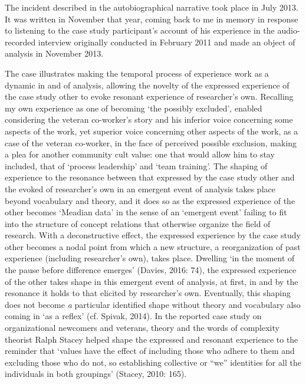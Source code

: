The incident described in the autobiographical narrative took place in July 2013. It was written in November that year, coming back to me in memory in response to listening to the case study participant’s account of his experience in the audio-recorded interview originally conducted in February 2011 and made an object of analysis in November 2013. 

The case illustrates making the temporal process of experience work as a dynamic in and of analysis, allowing the novelty of the expressed experience of the case study other to evoke resonant experience of researcher’s own. Recalling my own experience as one of becoming ‘the possibly excluded’, enabled considering the veteran co-worker’s story and his inferior voice concerning some aspects of the work, yet superior voice concerning other aspects of the work, as a case of the veteran co-worker, in the face of perceived possible exclusion, making a plea for another community cult value: one that would allow him to stay included, that of ‘process leadership’ and ‘team training’. The shaping of experience to the resonance between that expressed by the case study other and the evoked of researcher’s own in an emergent event of analysis takes place beyond vocabulary and theory, and it does so as the expressed experience of the other becomes ‘Meadian data’ in the sense of an ‘emergent event’ failing to fit into the structure of concept relations that otherwise organize the field of research. With a deconstructive effect, the expressed experience by the case study other becomes a nodal point from which a new structure, a reorganization of past experience (including researcher’s own), takes place. Dwelling ‘in the moment of the pause before difference emerges’ (Davies, 2016: 74), the expressed experience of the other takes shape in this emergent event of analysis, at first, in and by the resonance it holds to that elicited by researcher’s own. Eventually, this shaping does not become \textit{a} particular identified shape without theory and vocabulary also coming in ‘as a reflex’ (cf. Spivak, 2014). In the reported case study on organizational newcomers and veterans, theory and the words of complexity theorist Ralph Stacey helped shape the expressed and resonant experience to the reminder that ‘values have the effect of including those who adhere to them and excluding those who do not, so establishing collective or “we” identities for all the individuals in both groupings’ (Stacey, 2010: 165).  

